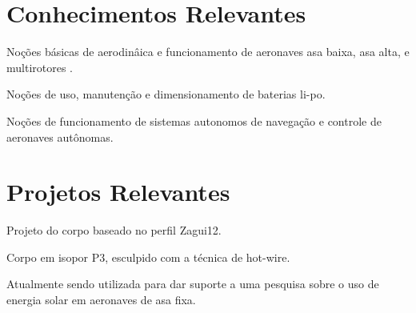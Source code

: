 \documentclass[letterpaper]{deedy-resume} %
\begin{document}
\begin{minipage}[t]{0.66\textwidth}



\section{Conhecimentos Relevantes }

\begin{tightitemize}
\item Noções básicas de aerodinâica e funcionamento de aeronaves asa baixa, asa alta, e multirotores . 
\item Noções de uso, manutenção e dimensionamento de baterias li-po.
\item Noções de funcionamento de sistemas autonomos de navegação e controle de aeronaves autônomas.
\end{tightitemize}

\sectionspace %



\sectionspace %

\section{Projetos Relevantes}

\location{    }
\begin{tightitemize}
\item Projeto do corpo baseado no perfil Zagui12.
\item Corpo em isopor P3, esculpido com a técnica de hot-wire.
\item Atualmente sendo utilizada para dar suporte a uma pesquisa sobre o uso de energia solar em aeronaves de asa fixa.
\end{tightitemize}


\end{minipage}
\end{document}
